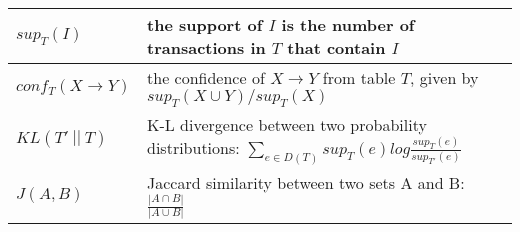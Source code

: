 \begin{table}[th]
\begin{tabular}{m{}|m{}}
  $sup_{T}(I)$ & the support of $I$ is the number of transactions in $T$ that 
contain $I$\\ \hline
  $conf_{T}(X \rightarrow Y)$ & the confidence of $X \rightarrow Y$ from table $T$, given by $sup_T(X \cup Y)/sup_T(X)$ \\ \hline
  $KL(T'~||~T)$ & K-L divergence between two probability distributions:
  $\sum_{e\in D(T)}sup_T(e)log\frac{sup_T(e) }{sup_{T'}(e)}$ 
  \\ \hline
  $J(A, B)$ & Jaccard similarity between two sets A and B:
  $\frac{|A \cap B|}{|A \cup B|}$ 
  \\ \hline
\end{tabular}
\end{table}



